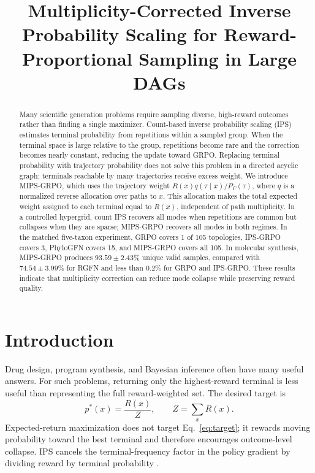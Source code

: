 \documentclass[11pt]{article}
\title{Multiplicity-Corrected Inverse Probability Scaling for
Reward-Proportional Sampling in Large DAGs}
\author{}
\date{}
\begin{document}
\maketitle

\begin{abstract}
Many scientific generation problems require sampling diverse, high-reward
outcomes rather than finding a single maximizer. Count-based inverse probability
scaling (IPS) estimates terminal probability from repetitions within a sampled
group. When the terminal space is large relative to the group, repetitions
become rare and the correction becomes nearly constant, reducing the update
toward GRPO. Replacing terminal probability with trajectory probability does
not solve this problem in a directed acyclic graph: terminals reachable by many
trajectories receive excess weight. We introduce MIPS-GRPO, which uses the
trajectory weight \(R(x)q(\tau\mid x)/P_F(\tau)\), where \(q\) is a normalized
reverse allocation over paths to \(x\). This allocation makes the total expected
weight assigned to each terminal equal to \(R(x)\), independent of path
multiplicity. In a controlled hypergrid, count IPS recovers all modes when
repetitions are common but collapses when they are sparse; MIPS-GRPO recovers all
modes in both regimes. In the matched five-taxon experiment, GRPO covers 1 of
105 topologies, IPS-GRPO covers 3, PhyloGFN covers 15, and MIPS-GRPO covers all
105. In molecular synthesis, MIPS-GRPO produces \(93.59\pm2.43\%\) unique valid
samples, compared with \(74.54\pm3.99\%\) for RGFN and less than 0.2\% for GRPO
and IPS-GRPO. These results indicate that multiplicity correction can reduce
mode collapse while preserving reward quality.
\end{abstract}

\section{Introduction}

Drug design, program synthesis, and Bayesian inference often have many useful
answers. For such problems, returning only the highest-reward terminal is less
useful than representing the full reward-weighted set. The desired target is
\begin{equation}
 p^*(x)=\frac{R(x)}{Z}, \qquad Z=\sum_x R(x).
 \label{eq:target}
\end{equation}
Expected-return maximization does not target Eq.~\eqref{eq:target}; it rewards
moving probability toward the best terminal and therefore encourages
outcome-level collapse. IPS cancels the terminal-frequency factor in the
policy gradient by dividing reward by terminal probability
\citep{sinha2026ips}.
\end{document}

